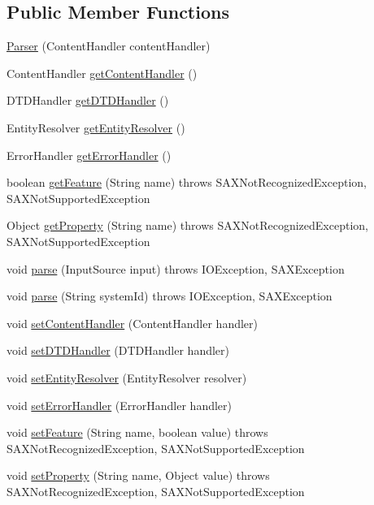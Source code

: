 \subsection*{Public Member Functions}
\begin{DoxyCompactItemize}
\item 
\hyperlink{classrob_o_s2_1_1xml_1_1_parser_aefd8cbfe55b9b254031589c0630032eb}{Parser} (ContentHandler contentHandler)
\item 
ContentHandler \hyperlink{classrob_o_s2_1_1xml_1_1_parser_a344ff5ec7c5ac033a3d60923adc771e2}{getContentHandler} ()
\item 
DTDHandler \hyperlink{classrob_o_s2_1_1xml_1_1_parser_a4439a12da3c36265b8bff6cf4857d7cd}{getDTDHandler} ()
\item 
EntityResolver \hyperlink{classrob_o_s2_1_1xml_1_1_parser_ae878333d3d2c9dfc389ea5c0b09f8aeb}{getEntityResolver} ()
\item 
ErrorHandler \hyperlink{classrob_o_s2_1_1xml_1_1_parser_a35d1e6e39299704412ada1e25c3ff31a}{getErrorHandler} ()
\item 
boolean \hyperlink{classrob_o_s2_1_1xml_1_1_parser_aefc2d9f86026104d9ec5a05773caa07b}{getFeature} (String name)  throws SAXNotRecognizedException, 			SAXNotSupportedException 
\item 
Object \hyperlink{classrob_o_s2_1_1xml_1_1_parser_a1c69d262922035a71e605415864ffce8}{getProperty} (String name)  throws SAXNotRecognizedException, 			SAXNotSupportedException 
\item 
void \hyperlink{classrob_o_s2_1_1xml_1_1_parser_abef71718c087c13fea08f605dfd949ae}{parse} (InputSource input)  throws IOException, SAXException 
\item 
void \hyperlink{classrob_o_s2_1_1xml_1_1_parser_a5419d44272eea7499f369f9468b7b8d9}{parse} (String systemId)  throws IOException, SAXException 
\item 
void \hyperlink{classrob_o_s2_1_1xml_1_1_parser_a886cc447fd1f8374e0694aeb98785472}{setContentHandler} (ContentHandler handler)
\item 
void \hyperlink{classrob_o_s2_1_1xml_1_1_parser_abdde678628812bb59d83358db60c824f}{setDTDHandler} (DTDHandler handler)
\item 
void \hyperlink{classrob_o_s2_1_1xml_1_1_parser_ac0e8fc3f9804fe62eda978c23e87cb28}{setEntityResolver} (EntityResolver resolver)
\item 
void \hyperlink{classrob_o_s2_1_1xml_1_1_parser_a1ac100c573ca42155be97664da69ac99}{setErrorHandler} (ErrorHandler handler)
\item 
void \hyperlink{classrob_o_s2_1_1xml_1_1_parser_a1b70bd1ee10c1f05871e6de04de221e5}{setFeature} (String name, boolean value)  throws SAXNotRecognizedException, SAXNotSupportedException 
\item 
void \hyperlink{classrob_o_s2_1_1xml_1_1_parser_ad96b189ed2c2122fcc524f946c7806f7}{setProperty} (String name, Object value)  throws SAXNotRecognizedException, SAXNotSupportedException 
\end{DoxyCompactItemize}
